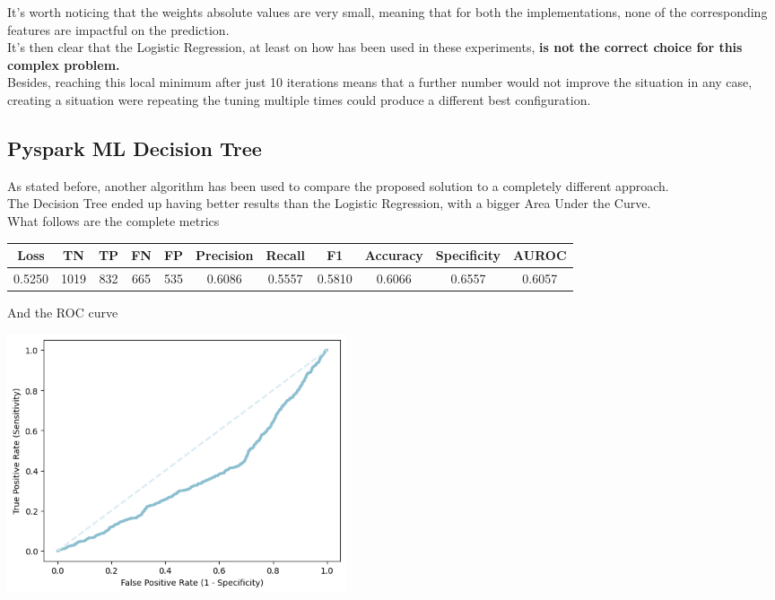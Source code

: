 \documentclass[
	letterpaper, %
	10pt, %
]{class}
\begin{document}
It's worth noticing that the weights absolute values are very small, meaning that for both the implementations, none of the corresponding features are impactful on the prediction.\\
It's then clear that the Logistic Regression, at least on how has been used in these experiments, \textbf{is not the correct choice for this complex problem.}\\

Besides, reaching this local minimum after just 10 iterations means that a further number would not improve the situation in any case, creating a situation were repeating the tuning multiple times could produce a different best configuration.

\subsection{Pyspark ML Decision Tree}

As stated before, another algorithm has been used to compare the proposed solution to a completely different approach.\\
The Decision Tree ended up having better results than the Logistic Regression, with a bigger Area Under the Curve.\\
What follows are the complete metrics

\begin{center}
    \begin{tabular}{ |c|c|c|c|c|c|c|c|c|c|c| }
        \hline
        Loss   & TN   & TP  & FN  & FP  & Precision & Recall & F1     & Accuracy & Specificity & AUROC  \\
        \hline
        0.5250 & 1019 & 832 & 665 & 535 & 0.6086    & 0.5557 & 0.5810 & 0.6066   & 0.6557      & 0.6057 \\
        \hline
    \end{tabular}
\end{center}

And the ROC curve

\begin{center}
    \includegraphics[width=10cm]{../images/tree_roc.png}
\end{center}
\end{document}
